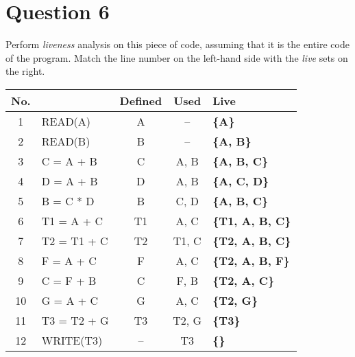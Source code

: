 \documentclass{article}
\begin{document}
\section*{Question 6}
Perform \textit{liveness} analysis on this piece of code, assuming that it is the entire code of the program. Match the line number on the left-hand side with the \textit{live} sets on the right. \\
\begin{tabular}{|c|l|c|c|>{\bfseries}l|}
  \hline
  \textbf{No.} &  & \textbf{Defined} & \textbf{Used} & \textbf{Live} \\
  \hline
  1   & READ(A)     & A  & --    & \{A\} \\
  \hline
  2   & READ(B)     & B  & --    & \{A, B\} \\
  \hline
  3   & C = A + B   & C  & A, B  & \{A, B, C\} \\
  \hline
  4   & D = A + B   & D  & A, B  & \{A, C, D\} \\
  \hline
  5   & B = C * D   & B  & C, D  & \{A, B, C\} \\
  \hline
  6   & T1 = A + C  & T1 & A, C  & \{T1, A, B, C\} \\
  \hline
  7   & T2 = T1 + C & T2 & T1, C & \{T2, A, B, C\} \\
  \hline
  8   & F = A + C   & F  & A, C  & \{T2, A, B, F\} \\
  \hline
  9   & C = F + B   & C  & F, B  & \{T2, A, C\} \\
  \hline
  10  & G = A + C   & G  & A, C  & \{T2, G\} \\
  \hline
  11  & T3 = T2 + G & T3 & T2, G & \{T3\} \\
  \hline
  12  & WRITE(T3)   & -- & T3    & \{\} \\
  \hline
\end{tabular}
\end{document}
